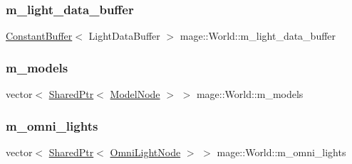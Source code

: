 \hypertarget{classmage_1_1_world_af6a9ec5ab7482665d4c2e8c908e9c2a9}{}\label{classmage_1_1_world_af6a9ec5ab7482665d4c2e8c908e9c2a9} 
\subsubsection{\texorpdfstring{m\+\_\+light\+\_\+data\+\_\+buffer}{m\_light\_data\_buffer}}
{\footnotesize\ttfamily \hyperlink{structmage_1_1_constant_buffer}{Constant\+Buffer}$<$ Light\+Data\+Buffer $>$ mage\+::\+World\+::m\+\_\+light\+\_\+data\+\_\+buffer\hspace{0.3cm}{\ttfamily [private]}}

\hypertarget{classmage_1_1_world_af09ef36bad18a99a9ebf0be59737b561}{}\label{classmage_1_1_world_af09ef36bad18a99a9ebf0be59737b561} 
\subsubsection{\texorpdfstring{m\+\_\+models}{m\_models}}
{\footnotesize\ttfamily vector$<$ \hyperlink{namespacemage_a1e01ae66713838a7a67d30e44c67703e}{Shared\+Ptr}$<$ \hyperlink{namespacemage_a3086b6de2ec7ebd59d8b0bdc57195760}{Model\+Node} $>$ $>$ mage\+::\+World\+::m\+\_\+models\hspace{0.3cm}{\ttfamily [private]}}

\hypertarget{classmage_1_1_world_a3f4164ea7cb5be1873c5b34d237cac0e}{}\label{classmage_1_1_world_a3f4164ea7cb5be1873c5b34d237cac0e} 
\subsubsection{\texorpdfstring{m\+\_\+omni\+\_\+lights}{m\_omni\_lights}}
{\footnotesize\ttfamily vector$<$ \hyperlink{namespacemage_a1e01ae66713838a7a67d30e44c67703e}{Shared\+Ptr}$<$ \hyperlink{namespacemage_a5d71843ded3749108547eba2a5ce4d85}{Omni\+Light\+Node} $>$ $>$ mage\+::\+World\+::m\+\_\+omni\+\_\+lights\hspace{0.3cm}{\ttfamily [private]}}

